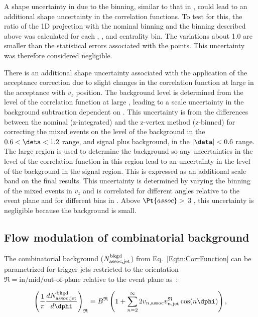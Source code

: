 A shape uncertainty in \dphi due to the \zvtx binning, similar to that in \deta, could lead to an additional shape uncertainty in the correlation functions.  To test for this, the ratio of the 1D \dphi projection with the nominal \zvtx binning and the binning described above was calculated for each , , and centrality bin.  The variations about 1.0 are smaller than the statistical errors associated with the points.  This uncertainty was therefore considered negligible.

There is an additional shape uncertainty associated with the application of the acceptance correction due to slight changes in the correlation function at large \deta in the acceptance with $v_z$ position.  The background level is determined from the level of the correlation function at large \deta, leading to a scale uncertainty in the background subtraction dependent on .  This uncertainty is from the differences between the nominal (z-integrated) and the z-vertex method (z-binned) for correcting the mixed events on the level of the background in the $0.6 < \deta < 1.2$ range, and signal plus background, in the $|\deta| < 0.6$ range.  The large \deta region is used to determine the background so any uncertainties in the level of the correlation function in this region lead to an uncertainty in the level of the background in the signal region.  This is expressed as an additional scale band on the final results.  This uncertainty is determined by varying the binning of the mixed events in $v_z$ and is correlated for different angles relative to the event plane and for different bins in .  Above $\Pt{assoc} >$ 3 \GeVc, this uncertainty is negligible because the background is small.

\subsection{Flow modulation of combinatorial background} \label{sect:CorrBkgd}
The combinatorial background ($N^{\rm bkgd}_{\rm assoc,jet}$) from Eq.~\ref{Eqtn:CorrFunction} can be parametrized for trigger jets restricted to the orientation $\mathfrak{R} = {\text{in/mid/out-of-plane}}$ relative to the event plane as~\cite{Bielcikova:2003ku,Sharma:2015qra}:

\begin{equation}
	\left(\frac{1}{\pi}\frac{dN^{\rm bkgd}_{\rm assoc,jet}}{d\dphi}\right)_\mathfrak{R} = B^\mathfrak{R}\left( 1 + \sum_{n=2}^{\infty} 2 v_{n,\mathrm{assoc}} v^\mathfrak{R}_{n, \mathrm{jet}} \cos(n\dphi)\right)
	\label{Eqtn:JBBBCorrelations},
\end{equation}


